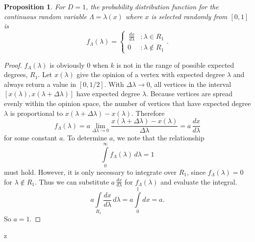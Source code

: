 \documentclass[a4paper,10pt]{article}
\newtheorem{prop}{Proposition}
\begin{document}
\begin{prop}
 For $D=1$, the probability distribution function for the continuous random variable $\Lambda = \lambda(x)$ where $x$ is selected randomly from $[0, 1]$ is
 \begin{equation}
 f_\Lambda(\lambda) = \left\{
     \begin{array}{lr}
  \,\frac{dx}{d\lambda} & : \lambda \in R_1 \\
  0 & : \lambda \notin R_1
     \end{array}
   \right..
\end{equation}
\end{prop}
\begin{proof}
$f_\Lambda(\lambda)$ is obviously 0 when $k$ is not in the range of possible expected degrees, $R_1$. Let $x(\lambda)$ give the opinion of a vertex with expected degree $\lambda$ and always return a value in $[0, 1/2]$. With $\Delta \lambda \to 0$, all vertices in the interval $[x(\lambda), x(\lambda + \Delta \lambda)]$ have expected degree $\lambda$. Because vertices are spread evenly within the opinion space, the number of vertices that have expected degree $\lambda$ is proportional to $x(\lambda + \Delta \lambda) - x(\lambda)$. Therefore
\begin{equation}
 f_\Lambda(\lambda) = a \lim\limits_{\Delta \lambda \to 0} \frac{x(\lambda + \Delta \lambda) - x(\lambda)}{\Delta \lambda} = a \, \frac{dx}{d\lambda}
\end{equation}
for some constant $a$. To determine $a$, we note that the relationship 
\begin{equation}
 \int\limits_{0}^\infty f_\Lambda(\lambda)\, d\lambda = 1
\end{equation}
must hold. However, it is only necessary to integrate over $R_1$, since $f_\Lambda(\lambda) = 0$ for $\lambda \notin R_1$. Thus we can substitute $a \, \frac{dx}{d\lambda}$ for $f_\Lambda(\lambda)$ and evaluate the integral.
\begin{equation}
 a\int\limits_{R_1} \frac{dx}{d\lambda} \, d\lambda = a\int\limits_{0}^1 dx = a.
\end{equation}
So $a = 1$.
\end{proof}z
\end{document}
